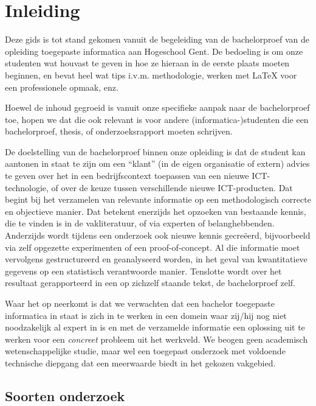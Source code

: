 \chapter{Inleiding}
\label{ch:inleiding}

Deze gids is tot stand gekomen vanuit de begeleiding van de bachelorproef van de opleiding toegepaste informatica aan Hogeschool Gent. De bedoeling is om onze studenten wat houvast te geven in hoe ze hieraan in de eerste plaats moeten beginnen, en bevat heel wat tips i.v.m. methodologie, werken met {\LaTeX} voor een professionele opmaak, enz.

Hoewel de inhoud gegroeid is vanuit onze specifieke aanpak naar de bachelorproef toe, hopen we dat die ook relevant is voor andere (informatica-)studenten die een bachelorproef, thesis, of onderzoeksrapport moeten schrijven.

De doelstelling van de bachelorproef binnen onze opleiding is dat de student kan aantonen in staat te zijn om een ``klant'' (in de eigen organisatie of extern) advies te geven over het in een bedrijfscontext toepassen van een nieuwe ICT-technologie, of over de keuze tussen verschillende nieuwe ICT-producten. Dat begint bij het verzamelen van relevante informatie op een methodologisch correcte en objectieve manier. Dat betekent enerzijds het opzoeken van bestaande kennis, die te vinden is in de vakliteratuur, of via experten of belanghebbenden. Anderzijds wordt tijdens een onderzoek ook nieuwe kennis gecreëerd, bijvoorbeeld via zelf opgezette experimenten of een proof-of-concept. Al die informatie moet vervolgens gestructureerd en geanalyseerd worden, in het geval van kwantitatieve gegevens op een statistisch verantwoorde manier. Tenslotte wordt over het resultaat gerapporteerd in een op zichzelf staande tekst, de bachelorproef zelf.

Waar het op neerkomt is dat we verwachten dat een bachelor toegepaste informatica in staat is zich in te werken in een domein waar zij/hij nog niet noodzakelijk al expert in is en met de verzamelde informatie een oplossing uit te werken voor een \emph{concreet} probleem uit het werkveld. We beogen geen academisch wetenschappelijke studie, maar wel een toegepast onderzoek met voldoende technische diepgang dat een meerwaarde biedt in het gekozen vakgebied.

\section{Soorten onderzoek}
\label{sec:soorten-onderzoek}

